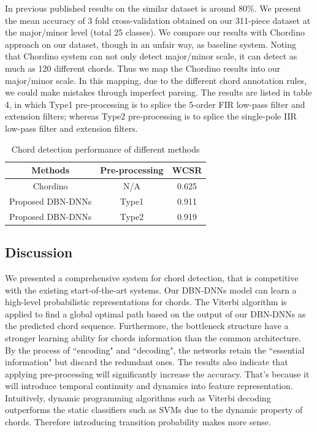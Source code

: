 \documentclass{article}
\begin{document}
In previous published results \cite{cho2011feature} on the similar dataset is around 80\%. We present the mean accuracy of 3 fold cross-validation obtained on our 311-piece dataset at the major/minor level (total 25 classes). We compare our results with Chordino approach on our dataset, though in an unfair way, as baseline system. Noting that Chordino system can not only detect major/minor scale, it can detect as much as 120 different chords. Thus we map the Chordino results into our major/minor scale. In this mapping, due to the different chord annotation rules, we could make mistakes through imperfect parsing. The results are listed in table 4, in which Type1 pre-processing is to splice the 5-order FIR low-pass filter and extension filters; whereas Type2 pre-processing is to splice the single-pole IIR low-pass filter and extension filters. 

\begin{table}[h]
\begin{tabular}{@{}ccc@{}}
\toprule
Methods   & Pre-processing & WCSR   \\ \midrule
Chordino & N/A            & 0.625       \\
Proposed DBN-DNNs & Type1          & 0.911 \\
Proposed DBN-DNNs & Type2          & 0.919   \\ \bottomrule
\end{tabular}
\caption{Chord detection performance of different methods}
\end{table}

\subsection{Discussion}
We presented a comprehensive system for chord detection, that is competitive with the existing start-of-the-art systems. Our DBN-DNNs model can learn a high-level probabilistic representations for chords. The Viterbi algorithm is applied to find a global optimal path based on the output of our DBN-DNNs as the predicted chord sequence. Furthermore, the bottleneck structure have a stronger learning ability for chords information than the common architecture. By the process of ``encoding" and ``decoding", the networks retain the ``essential information" but discard the redundant ones. The results also indicate that applying pre-processing will significantly increase the accuracy. That's because it will introduce temporal continuity and dynamics into feature representation. Intuitively, dynamic programming algorithms such as Viterbi decoding outperforms the static classifiers such as SVMs due to the dynamic property of chords. Therefore introducing transition probability makes more sense. 
\end{document}
